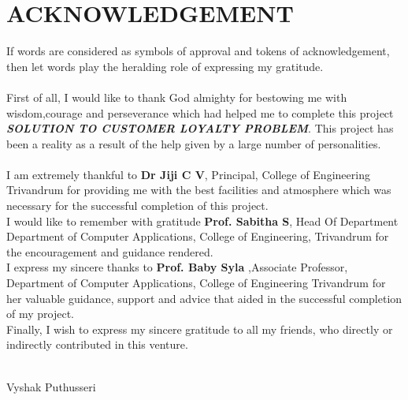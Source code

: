 \chapter*{\rm \large \bf ACKNOWLEDGEMENT}
\vspace{4.0mm}
\setlength{\parindent}{1cm} 


\indent If words are considered as symbols of approval and tokens of
acknowledgement, then let words play the heralding role of expressing my
gratitude.\\ \\
\indent First of all, I would like to thank God almighty for bestowing me with
wisdom,courage and perseverance which had helped me to complete this
project \textbf{\textit{SOLUTION TO CUSTOMER LOYALTY PROBLEM}}.
This project has been a reality as a result of the help given by a large
number of personalities.\\ \\
\indent I am extremely thankful to \textbf{Dr Jiji C V}, Principal, College of Engineering Trivandrum for providing me with the best facilities and atmosphere which was necessary for the successful completion of this project.\\ 

\indent I would like to remember with gratitude \textbf{Prof. Sabitha S},
Head Of Department Department of Computer Applications, College of Engineering,
Trivandrum for the encouragement and guidance rendered.\\ 

\indent I express my sincere thanks to \textbf{Prof. Baby Syla },Associate
Professor, Department of Computer Applications, College of Engineering
Trivandrum for her valuable guidance, support and advice that aided in the
successful completion of my project.\\ 

\indent Finally, I wish to express my sincere gratitude to all my friends,
who directly or indirectly contributed in this venture. \\ \\




\begin{flushright}
Vyshak Puthusseri\\


\end{flushright}
\newpage
